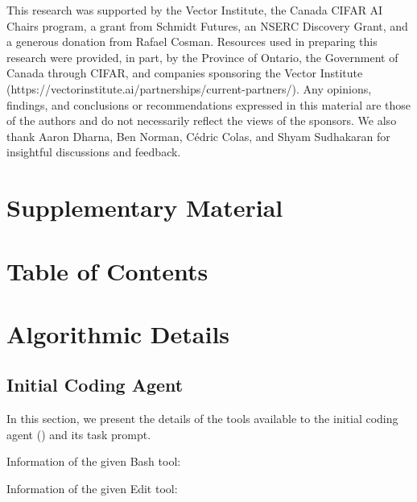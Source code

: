 \documentclass{article}
\begin{document}
\begin{ack}
This research was supported by the Vector Institute, the Canada CIFAR AI Chairs program, a grant from Schmidt Futures, an NSERC Discovery Grant, and a generous donation from Rafael Cosman. Resources used in preparing this research were provided, in part, by the Province of Ontario, the Government of Canada through CIFAR, and companies sponsoring the Vector Institute (https://vectorinstitute.ai/partnerships/current-partners/). Any opinions, findings, and conclusions or recommendations expressed in this material are those of the authors and do not necessarily reflect the views of the sponsors. We also thank Aaron Dharna, Ben Norman, Cédric Colas, and Shyam Sudhakaran for insightful discussions and feedback.
\end{ack}




\clearpage
\appendix

\section*{\LARGE Supplementary Material}

\vspace*{20pt}
\section*{Table of Contents}
\vspace*{-5pt}
\startcontents[sections]

\clearpage

\section{Algorithmic Details}

\subsection{Initial Coding Agent}
\label{app:initial-agent}

In this section, we present the details of the tools available to the initial coding agent () and its task prompt.

Information of the given Bash tool:


Information of the given Edit tool:

\end{document}
